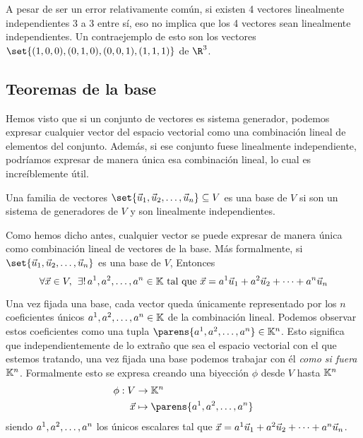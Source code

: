 \documentclass[../algebra_lineal.tex]{subfiles}
\begin{document}
    \begin{remark}
        A pesar de ser un error relativamente común, si existen 4 vectores linealmente independientes 3 a 3 entre sí, eso no implica que los 4 vectores sean linealmente independientes. Un contraejemplo de esto son los vectores $\set{(1,0,0),(0,1,0),(0,0,1),(1,1,1)}$ de $\R^3$.
    \end{remark}

\subsection{Teoremas de la base}

Hemos visto que si un conjunto de vectores es sistema generador, podemos expresar cualquier vector del espacio vectorial como una combinación lineal de elementos del conjunto. Además, si ese conjunto fuese linealmente independiente, podríamos expresar de manera única esa combinación lineal, lo cual es increíblemente útil.

\begin{definition}[Base]
    Una familia de vectores $\set{\vlst{u}{n}} \subseteq V$ es una base de $V$ si son un sistema de generadores de $V$ y son linealmente independientes.
\end{definition}

Como hemos dicho antes, cualquier vector se puede expresar de manera única como combinación lineal de vectores de la base. Más formalmente, si $\set{\vlst{u}{n}}$ es una base de $V$, Entonces
$$\forall \vec{x} \in V, \hspace{1.5mm} \exists! \, {a}^{1}, {a}^{2}, \dots, {a}^{n} \in \mathbb{K} \mathrm{\,\, tal \,\, que \,\,} \vec{x} = {a}^{1}\vec{u}_{1}+{a}^{2}\vec{u}_{2}+\dots+{a}^{n}\vec{u}_{n}$$ 

\begin{remark}
    Una vez fijada una base, cada vector queda únicamente representado por los $n$ coeficientes únicos  ${a}^{1}, {a}^{2}, \dots, {a}^{n} \in \mathbb{K}$ de la combinación lineal. Podemos observar estos coeficientes como una tupla $\parens{\slst{a}{n}} \in \K^n$. Esto significa que independientemente de lo extraño que sea el espacio vectorial con el que estemos tratando, una vez fijada una base podemos trabajar con él \textit{como si fuera} $\mathbb{K}^n$. Formalmente esto se expresa creando una biyección $\phi$ desde $V$ hasta $\mathbb{K}^n$
    \begin{align*}
        \phi: V &\to \K^n \\
            \vx &\mapsto \parens{\slst{a}{n}}
    \end{align*} 
    siendo ${a}^{1}, {a}^{2}, \dots, {a}^{n}$ los únicos escalares tal que $\vec{x} = {a}^{1}\vec{u}_{1}+{a}^{2}\vec{u}_{2}+\dots+{a}^{n}\vec{u}_{n}$.
\end{remark}
\end{document}
